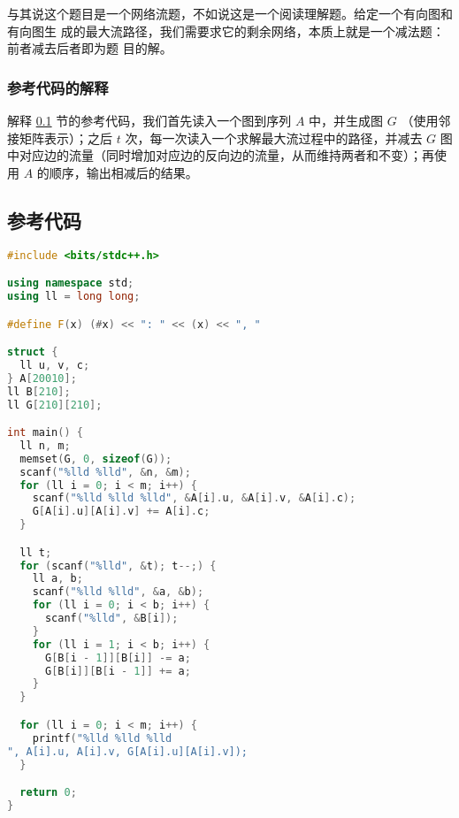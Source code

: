 与其说这个题目是一个网络流题，不如说这是一个阅读理解题。给定一个有向图和有向图生
成的最大流路径，我们需要求它的剩余网络，本质上就是一个减法题：前者减去后者即为题
目的解。

\subsubsection{参考代码的解释}
解释 \ref{1589:ckdm} 节的参考代码，我们首先读入一个图到序列 $A$ 中，并生成图 $G$
（使用邻接矩阵表示）；之后 $t$ 次，每一次读入一个求解最大流过程中的路径，并减去
$G$ 图中对应边的流量（同时增加对应边的反向边的流量，从而维持两者和不变）；再使用
$A$ 的顺序，输出相减后的结果。

\subsection{参考代码}
\label{1589:ckdm}
\begin{lstlisting}[language=C++]
#include <bits/stdc++.h>

using namespace std;
using ll = long long;

#define F(x) (#x) << ": " << (x) << ", "

struct {
  ll u, v, c;
} A[20010];
ll B[210];
ll G[210][210];

int main() {
  ll n, m;
  memset(G, 0, sizeof(G));
  scanf("%lld %lld", &n, &m);
  for (ll i = 0; i < m; i++) {
    scanf("%lld %lld %lld", &A[i].u, &A[i].v, &A[i].c);
    G[A[i].u][A[i].v] += A[i].c;
  }

  ll t;
  for (scanf("%lld", &t); t--;) {
    ll a, b;
    scanf("%lld %lld", &a, &b);
    for (ll i = 0; i < b; i++) {
      scanf("%lld", &B[i]);
    }
    for (ll i = 1; i < b; i++) {
      G[B[i - 1]][B[i]] -= a;
      G[B[i]][B[i - 1]] += a;
    }
  }

  for (ll i = 0; i < m; i++) {
    printf("%lld %lld %lld
", A[i].u, A[i].v, G[A[i].u][A[i].v]);
  }

  return 0;
}
\end{lstlisting}
